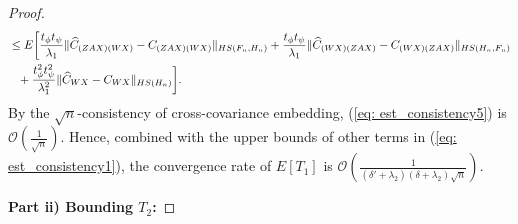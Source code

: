 \begin{proof}
\begin{align}
                                                                   &\leq E\bigg[\frac{t_{\phi}t_{\psi}}{\lambda_1}\|\widehat{C}_{(ZAX)(WX)}-C_{(ZAX)(WX)}\|_{HS(F_n,H_n)} + \frac{t_{\phi}t_{\psi}}{\lambda_1}\|\widehat{C}_{(WX)(ZAX)}-C_{(WX)(ZAX)}\|_{HS(H_n,F_n)} \notag\\
                                                                        &\phantom{\leq}+ \frac{t^2_{\phi}t^2_{\psi}}{\lambda^2_1}\|\widehat{C}_{WX}-C_{WX}\|_{HS(H_n)}\bigg]. 
    \end{align}
    By the $\sqrt{n}$-consistency of cross-covariance embedding, 
    (\ref{eq: est_consistency5}) is $\mathcal{O}(\frac{1}{\sqrt{n}})$. 
    Hence, combined with the upper bounds of other terms in (\ref{eq: est_consistency1}), 
    the convergence rate of $E[T_1]$ is $\mathcal{O}(\frac{1}{(\delta'+\lambda_2)(\delta+\lambda_2)\sqrt{n}})$. 

    \textbf{Part ii) Bounding $T_2$:}


\end{proof}
